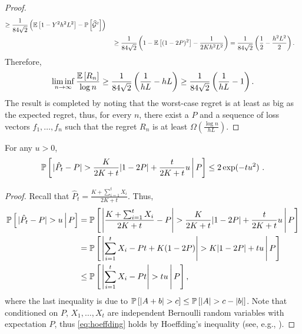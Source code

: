 \begin{proof}
\begin{align*}
	 \ge \frac{1}{84\sqrt{2}} \left( \mathbb{E}\left[ 1-Y^2h^2L^2 \right] - \mathbb{P}\left[\widehat{\mathcal{G}}^c\right]\right) \\
	& \quad \ge \frac{1}{84\sqrt{2}} \left( 1- \mathbb{E}\left[ (1-2P)^2 \right] - \frac{1}{2Kh^2L^2}\right)
	=  \frac{1}{84\sqrt{2}} \left(\frac{1}{2} - \frac{h^2L^2}{2}\right).
	\end{align*}
	Therefore, 
	\[
	\liminf\limits_{n\rightarrow \infty} \frac{\mathbb{E}\left[ R_n \right]}{\log n} \ge \frac{1}{84\sqrt{2}}\left(\frac{1}{hL} - hL\right) \ge \frac{1}{84\sqrt{2}}\left(\frac{1}{hL} - 1\right).
	\]
	The result is completed by noting that the worst-case regret is at least as big as the expected regret, thus, for every $n$, there exist a $P$ and a sequence of loss vectors $f_1,\ldots,f_n$ such that the regret $R_n$ is at least $\Omega(\frac{\log n }{hL})$.
\end{proof}


\begin{lemma}[Concentration of $\hP_{t}$] For any $u>0$,
	\label{lem:concenPhat}
	\[
	\mathbb{P}\left[\left. |\hat P_{t}-P| > \frac{K}{2K+t}|1-2P| + \frac{t}{2K+t}u \, \right| P\right] \le 2\exp(-tu^2)~.
	\]
\end{lemma}
\begin{proof}
	Recall that $\hat P_t = \frac{K+\sum_{i=1}^{t}X_i}{2K+t}$. Thus, 
	\begin{align} 
	\mathbb{P}\left[\left. |\hat P_{t}-P| > u  \, \right| P\right] & = \mathbb{P}\left[\left. \left| \frac{K+\sum_{i=1}^{t}X_i}{2K+t} -P\right| > \frac{K}{2K+t}|1-2P| + \frac{t}{2K+t}u \, \right| P\right] \nonumber \\ 
	& =  \mathbb{P}\left[\left. \left| \sum_{i=1}^{t}X_i - Pt + K(1-2P) \right| > K|1-2P|+ tu  \, \right| P\right] \nonumber \\ 
	& \le \mathbb{P}\left[\left. \left| \sum_{i=1}^{t}X_i - Pt \right| > tu  \, \right| P\right], \label{eq:hoeffding}
	\end{align}
	where the last inequality is due to $\Prob{|A+b|>c} \le \Prob{|A| > c-|b|}$. Note that conditioned on $P$, $X_1, \ldots, X_t$ are independent Bernoulli random variables with expectation $P$, thus \eqref{eq:hoeffding} holds by Hoeffding's inequality (see, e.g., \cite[Corollary~A.1]{CBLu06:book}).
\end{proof}


